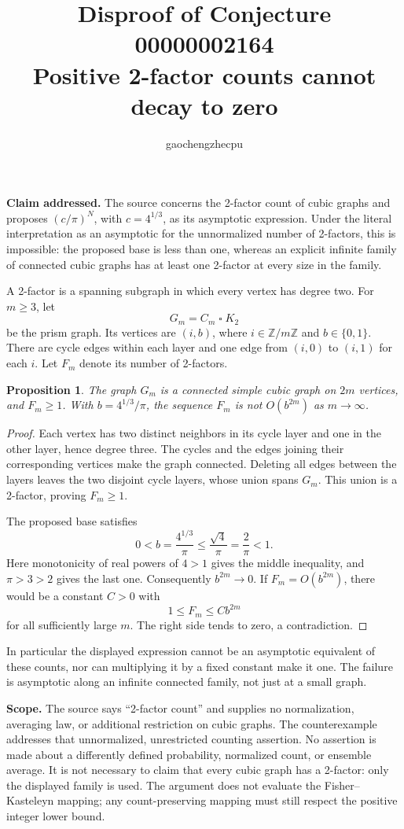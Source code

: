 \documentclass[11pt]{article}
\title{Disproof of Conjecture 00000002164\\Positive 2-factor counts cannot decay to zero}
\author{gaochengzhecpu}\date{}
\newtheorem{proposition}{Proposition}
\begin{document}
\maketitle
\noindent\textbf{Claim addressed.} The source concerns the 2-factor count of cubic graphs and proposes $(c/\pi)^N$, with $c=4^{1/3}$, as its asymptotic expression. Under the literal interpretation as an asymptotic for the unnormalized number of 2-factors, this is impossible: the proposed base is less than one, whereas an explicit infinite family of connected cubic graphs has at least one 2-factor at every size in the family.

A 2-factor is a spanning subgraph in which every vertex has degree two. For $m\ge3$, let
\[
 G_m=C_m\mathbin{\square}K_2
\]
be the prism graph. Its vertices are $(i,b)$, where $i\in\mathbb Z/m\mathbb Z$ and $b\in\{0,1\}$. There are cycle edges within each layer and one edge from $(i,0)$ to $(i,1)$ for each $i$. Let $F_m$ denote its number of 2-factors.

\begin{proposition}
The graph $G_m$ is a connected simple cubic graph on $2m$ vertices, and $F_m\ge1$. With $b=4^{1/3}/\pi$, the sequence $F_m$ is not $O(b^{2m})$ as $m\to\infty$.
\end{proposition}
\begin{proof}
Each vertex has two distinct neighbors in its cycle layer and one in the other layer, hence degree three. The cycles and the edges joining their corresponding vertices make the graph connected. Deleting all edges between the layers leaves the two disjoint cycle layers, whose union spans $G_m$. This union is a 2-factor, proving $F_m\ge1$.

The proposed base satisfies
\[
 0<b=\frac{4^{1/3}}{\pi}
 \le\frac{\sqrt4}{\pi}=\frac2\pi<1.
\]
Here monotonicity of real powers of $4>1$ gives the middle inequality, and $\pi>3>2$ gives the last one. Consequently $b^{2m}\to0$. If $F_m=O(b^{2m})$, there would be a constant $C>0$ with
\[
 1\le F_m\le Cb^{2m}
\]
for all sufficiently large $m$. The right side tends to zero, a contradiction.
\end{proof}

In particular the displayed expression cannot be an asymptotic equivalent of these counts, nor can multiplying it by a fixed constant make it one. The failure is asymptotic along an infinite connected family, not just at a small graph.

\noindent\textbf{Scope.} The source says ``2-factor count'' and supplies no normalization, averaging law, or additional restriction on cubic graphs. The counterexample addresses that unnormalized, unrestricted counting assertion. No assertion is made about a differently defined probability, normalized count, or ensemble average. It is not necessary to claim that every cubic graph has a 2-factor: only the displayed family is used. The argument does not evaluate the Fisher--Kasteleyn mapping; any count-preserving mapping must still respect the positive integer lower bound.
\end{document}
